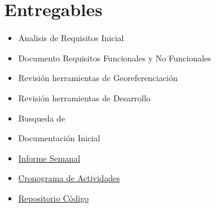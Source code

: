 \section{Entregables}

\begin{itemize}

	\item Analisis de Requisitos Inicial

	\item Documento Requisitos Funcionales y No Funcionales

	\item Revisión herramientas de Georeferenciación

	\item Revisión herramientas de Desarrollo 

	\item Busqueda de 

	\item Documentación Inicial

	\item \href{https://github.com/smonsalve/Epi/blob/master/informes/Semana1/Informe1.pdf}{Informe Semanal}

	\item \href{https://github.com/smonsalve/Epi/blob/master/doc/Cronograma.md} {Cronograma de Actividades}

	\item \href{https://github.com/smonsalve/Epi}{Repositorio Código}

\end{itemize}